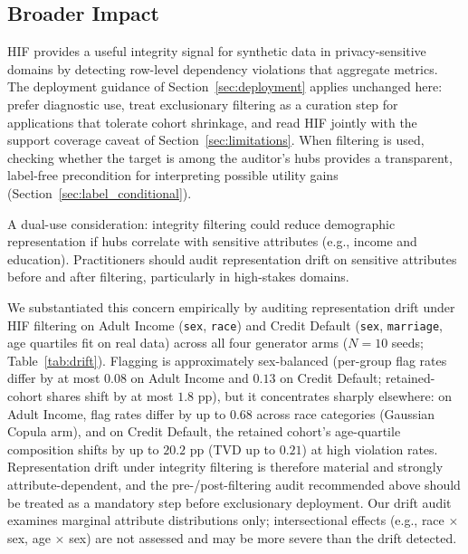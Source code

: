 \documentclass[pdflatex,sn-mathphys-num]{sn-jnl}
\theoremstyle{thmstyleone}%
\theoremstyle{thmstyletwo}%
\theoremstyle{thmstylethree}%
\begin{document}
\subsection{Broader Impact}\label{sec:broader_impact}

HIF provides a useful integrity signal for synthetic data in privacy-sensitive domains by detecting row-level dependency violations that aggregate metrics. The deployment guidance of Section~\ref{sec:deployment} applies unchanged here: prefer diagnostic use, treat exclusionary filtering as a curation step for applications that tolerate cohort shrinkage, and read HIF jointly with the support coverage caveat of Section~\ref{sec:limitations}. When filtering is used, checking whether the target is among the auditor's hubs provides a transparent, label-free precondition for interpreting possible utility gains (Section~\ref{sec:label_conditional}).

A dual-use consideration: integrity filtering could reduce demographic representation if hubs correlate with sensitive attributes (e.g., income and education). Practitioners should audit representation drift on sensitive attributes before and after filtering, particularly in high-stakes domains.

We substantiated this concern empirically by auditing representation drift under HIF filtering on Adult Income (\texttt{sex}, \texttt{race}) and Credit Default (\texttt{sex}, \texttt{marriage}, age quartiles fit on real data) across all four generator arms ($N=10$ seeds; Table~\ref{tab:drift}). Flagging is approximately sex-balanced (per-group flag rates differ by at most $0.08$ on Adult Income and $0.13$ on Credit Default; retained-cohort shares shift by at most $1.8$ pp), but it concentrates sharply elsewhere: on Adult Income, flag rates differ by up to $0.68$ across race categories (Gaussian Copula arm), and on Credit Default, the retained cohort's age-quartile composition shifts by up to $20.2$ pp (TVD up to $0.21$) at high violation rates. Representation drift under integrity filtering is therefore material and strongly attribute-dependent, and the pre-/post-filtering audit recommended above should be treated as a mandatory step before exclusionary deployment. Our drift audit examines marginal attribute distributions only; intersectional effects (e.g., race $\times$ sex, age $\times$ sex) are not assessed and may be more severe than the drift detected.
\end{document}
